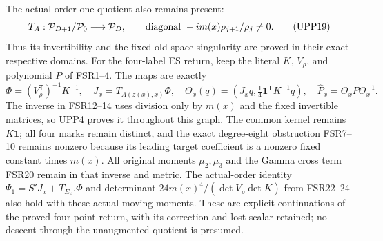 The actual order-one quotient also remains present:
\[
 T_A:\mathcal P_{D+1}/\mathcal P_0\longrightarrow\mathcal P_D,
 \qquad \hbox{diagonal }-im(x)\rho_{j+1}/\rho_j\ne0.
 \tag{UPP19}
\]
Thus its invertibility and the fixed old space singularity are proved
in their exact respective domains. For the four-label ES return, keep
the literal $K$, $V_\rho$, and polynomial $P$ of FSR1--4. The maps
are exactly
\[
 \Phi=(V_\rho^{\mathsf T})^{-1}K^{-1},\quad
 J_x=T_{A(z(x),x)}\Phi,\quad
 \Theta_x(q)=(J_xq,\tfrac14\mathbf1^{\mathsf T}K^{-1}q),\quad
 \widehat P_x=\Theta_xP\Theta_x^{-1}.
 \tag{UPP20}
\]
The inverse in FSR12--14 uses division only by $m(x)$ and the
fixed invertible matrices, so UPP4 proves it throughout this graph.
The common kernel remains $K\mathbf1$; all four marks remain
distinct, and the exact degree-eight obstruction FSR7--10 remains
nonzero because its leading target coefficient is a nonzero fixed
constant times $m(x)$. All original moments $\mu_2,\mu_3$ and the
Gamma cross term FSR20 remain in that inverse and metric. The
actual-order identity $\Psi_1=S'J_x+T_{E_A'}\Phi$ and determinant
$24m(x)^4/(\det V_\rho\det K)$ from FSR22--24 also hold with
these actual moving moments. These are explicit continuations of
the proved four-point return, with its correction and lost scalar
retained; no descent through the unaugmented quotient is presumed.

